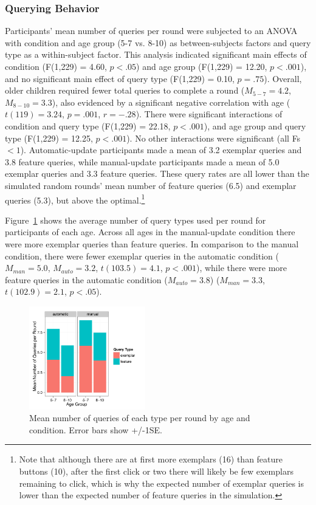 \documentclass[10pt,letterpaper]{article}
\begin{document}
\subsubsection{Querying Behavior}

Participants' mean number of queries per round were subjected to an 
ANOVA with condition and age group (5-7 vs. 8-10) as between-subjects factors and query type as a within-subject factor. This analysis indicated significant main effects of condition (F(1,229) = 4.60, $p<.05$) and age group (F(1,229) = 12.20, $p<.001$), and no significant main effect of query type (F(1,229) = 0.10, $p=.75$). Overall, older children required fewer total queries to complete a round ($M_{5-7} = 4.2$, $M_{8-10} = 3.3$),
also evidenced by a significant negative correlation with age ($t(119) = 3.24$, $p=.001$, $r=-.28$). There were significant interactions of condition and query type (F(1,229) = 22.18, 
$p<.001$), and age group and query type (F(1,229) = 12.25, $p<.001$). No other interactions were significant (all Fs $<1$). Automatic-update participants made a mean of 3.2 exemplar queries and 3.8 feature queries, while manual-update participants made a mean of 5.0 exemplar queries and 3.3 feature queries.
These query rates are all lower than the simulated random rounds' mean number of feature queries (6.5) and exemplar queries (5.3), but above the optimal.\footnote{Note that although there are at first more exemplars (16) than 
feature buttons (10), after the first click or two there will likely be few 
exemplars remaining to click, which is why the expected number of exemplar 
queries is lower than the expected number of feature queries in the simulation.} 

Figure~\ref{fig:clicks-per-agecond} 
shows the average number of query types used per round for 
participants of each age. Across all ages in the manual-update condition there were 
more exemplar queries than feature queries. In comparison to the manual condition, 
there were fewer exemplar queries in the automatic condition ($M_{man} = 5.0$, 
$M_{auto} = 3.2$, $t(103.5)=4.1$, $p<.001$), while there were more feature queries 
in the automatic condition ($M_{auto} = 3.8$) ($M_{man} = 3.3$, $t(102.9)=2.1$, 
$p<.05$). 

\begin{figure}[h]
  \centering
  \includegraphics[width=0.45\textwidth]{figures/clicks_by_ageGroup_condition_query_type}
  \caption{Mean number of queries of each type per round by age and condition. 
Error bars show +/-1SE.}
  \label{fig:clicks-per-agecond}
\end{figure} 
\end{document}
